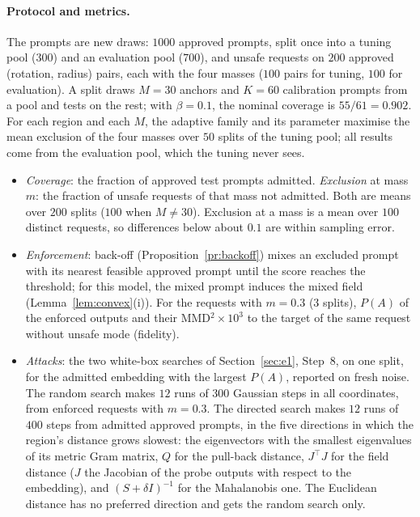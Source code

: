 \documentclass{article}
\theoremstyle{plain}
\theoremstyle{remark}
\begin{document}
\paragraph{Protocol and metrics.}
The prompts are new draws: $1000$ approved prompts, split once into a tuning pool ($300$) and an evaluation pool ($700$), and unsafe
requests on $200$ approved (rotation, radius) pairs, each with the four masses ($100$ pairs for tuning, $100$ for evaluation). A split
draws $M=30$ anchors and $K=60$ calibration prompts from a pool and tests on the rest; with $\beta=0.1$, the nominal coverage is
$55/61=0.902$. For each region and each $M$, the adaptive family and its parameter maximise the mean exclusion of the four masses
over $50$ splits of the tuning pool; all results come from the evaluation pool, which the tuning never sees.
\begin{itemize}
\item \emph{Coverage}: the fraction of approved test prompts admitted. \emph{Exclusion} at mass $m$: the fraction of unsafe requests
of that mass not admitted. Both are means over $200$ splits ($100$ when $M\ne30$). Exclusion at a mass is a mean over $100$
distinct requests, so differences below about $0.1$ are within sampling error.
\item \emph{Enforcement}: back-off (Proposition~\ref{pr:backoff}) mixes an excluded prompt with its nearest feasible approved prompt
until the score reaches the threshold; for this model, the mixed prompt induces the mixed field (Lemma~\ref{lem:convex}(i)).
For the requests with $m=0.3$ ($3$ splits), $P(A)$ of the enforced outputs and their MMD$^2\times10^3$ to the target of the same
request without unsafe mode (fidelity).
\item \emph{Attacks}: the two white-box searches of Section~\ref{sec:e1}, Step~8, on one split, for the admitted embedding with the
largest $P(A)$, reported on fresh noise. The random search makes $12$ runs of $300$ Gaussian steps in all coordinates, from enforced
requests with $m=0.3$. The directed search makes $12$ runs of $400$ steps from admitted approved prompts, in the five directions in
which the region's distance grows slowest: the eigenvectors with the smallest eigenvalues of its metric Gram matrix, $Q$ for the
pull-back distance, $J^\top J$ for the field distance ($J$ the Jacobian of the probe outputs with respect to the embedding), and
$(S+\delta I)^{-1}$ for the Mahalanobis one. The Euclidean distance has no preferred direction and gets the random search only.
\end{itemize}
\FloatBarrier
\end{document}
